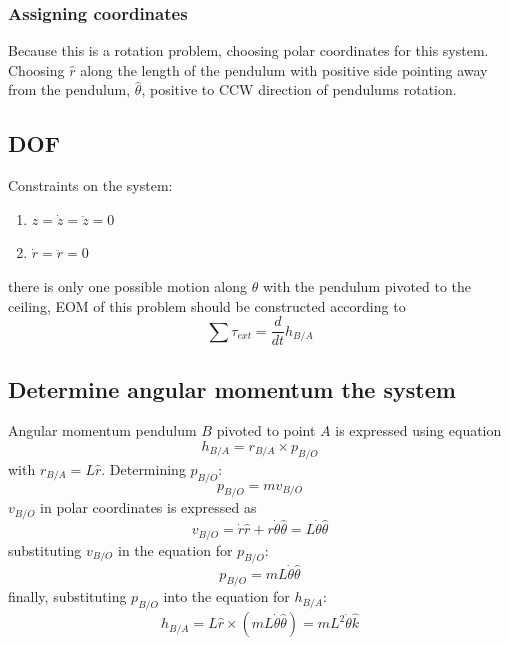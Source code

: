 \subsubsection{Assigning coordinates}

Because this is a rotation problem, choosing polar coordinates for this system. Choosing $\hat{r}$ along the length of the pendulum with positive side pointing away from the pendulum, $\hat{\theta}$, positive to CCW direction of pendulums rotation. 

\subsection{DOF}

Constraints on the system:
\begin{enumerate}
	\item $z = \dot{z} = \ddot{z} = 0$
	\item $\dot{r} = \ddot{r} = 0$
\end{enumerate}
there is only one possible motion along $\hat{\theta}$  with the pendulum pivoted to the ceiling, EOM of this problem should be constructed according to
\begin{equation}
	\sum \tau_{ext} = \frac{d}{dt}h_{B/A}
\end{equation}

\subsection{Determine angular momentum the system}

Angular momentum pendulum $B$ pivoted to point $A$ is expressed using equation
\begin{equation}
	h_{B/A} = r_{B/A} \times p_{B/O}
\end{equation}
with $r_{B/A} = L \hat{r}$. Determining $p_{B/O}$:
\begin{equation}
	p_{B/O} = m v_{B/O}
\end{equation}
$v_{B/O}$ in polar coordinates is expressed as
\begin{equation}
	v_{B/O} = \dot{r}\hat{r} + r \dot{\theta} \hat{\theta} = L \dot{\theta}\hat{\theta}
\end{equation}
substituting $v_{B/O}$ in the equation for $p_{B/O}$:
\begin{equation}
	p_{B/O} = m L \dot{\theta}\hat{\theta}
\end{equation}
finally, substituting $p_{B/O}$ into the equation for $h_{B/A}$:
\begin{equation}
	h_{B/A} = L \hat{r} \times \left(m L \dot{\theta}\hat{\theta}\right) = m L^{2} \dot{\theta} \hat{k}
\end{equation}

